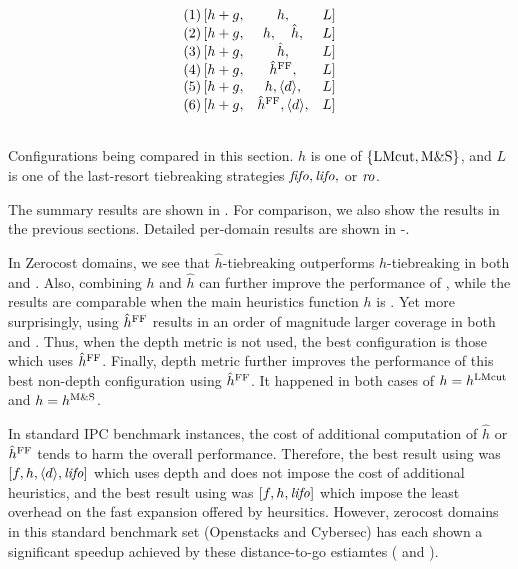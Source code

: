 \begin{table}[htbp]
 \centering
 \[
 \begin{array}{lcll}
  (1)\, [h+g, & h,                           &L] \\\relax
  (2)\, [h+g, & h,     \quad   \hat{h},      &L] \\\relax
  (3)\, [h+g, & \hat{h},                     &L] \\\relax
  (4)\, [h+g, & \hat{h}^{\text{FF}},               &L] \\\relax
  (5)\, [h+g, & h, {\left<d\right>}, &L] \\\relax
  (6)\, [h+g, & \hat{h}^{\text{FF}}, {\left<d\right>}, &L] \\\relax
 \end{array}  
 \]
 \caption{Configurations being compared in this section. $h$ is
 one of ${\left\{\text{LMcut}, \text{M\&S}\right\}}$, and $L$ is one of the last-resort
 tiebreaking strategies ${\text{\textit{fifo}}},{\text{\textit{lifo}}},$ or ${\text{\textit{ro}}}$. }
 \label{list:distance-configs}
\end{table}


The summary results are shown in . For
comparison, we also show the results in the previous sections.
Detailed per-domain results are shown in
-.

In Zerocost domains, we see that $\hat{h}$-tiebreaking outperforms
$h$-tiebreaking in both \lmcut and \mands. Also, combining $h$ and
$\hat{h}$ can further improve the performance of \lmcut, while the
results are comparable when the main heuristics function $h$ is \mands.
Yet more surprisingly, using $\hat{h}^{\text{FF}}$ results in an order of magnitude
larger coverage in both \lmcut and \mands. Thus, when the depth metric
is not used, the best configuration is those which uses $\hat{h}^{\text{FF}}$.
Finally, depth metric further improves the performance of this best
non-depth configuration using $\hat{h}^{\text{FF}}$.
It happened in both cases of $h=h^\text{LMcut}$ and $h=h^\text{M\&S}$. 

In standard IPC benchmark instances, the cost of additional computation of
$\hat{h}$ or $\hat{h}^{\text{FF}}$ tends to harm the overall performance.
Therefore, the best result using \lmcut was
$[f,h,{\left<d\right>},{\text{\textit{lifo}}}]$ which uses depth and does not impose the cost of
additional heuristics, and the best result using \mands
was $[f,h,{\text{\textit{lifo}}}]$ which impose the least overhead on the fast expansion offered by
\mands heursitics.
However, 
zerocost domains in this standard benchmark set (Openstacks and
Cybersec) has each shown a significant speedup achieved by these distance-to-go estiamtes
 ( and ).

